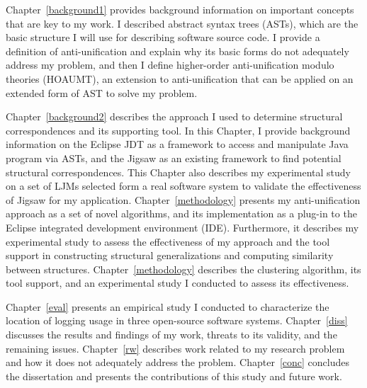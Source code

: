 Chapter~\ref{background1} provides background information on important concepts that are key to my work. I described abstract syntax trees (ASTs), which are the basic structure I will use for describing software source code. I provide a definition of anti-unification and explain why its basic forms do not adequately address my problem, and then I define higher-order anti-unification modulo theories (HOAUMT), an extension to anti-unification that can be applied on an extended form of AST to solve my problem. 

Chapter~\ref{background2} describes the approach I used to determine structural correspondences and its supporting tool. In this Chapter, I provide background information on the Eclipse JDT as a framework to access and manipulate Java program via ASTs, and the Jigsaw as an existing framework to find potential structural correspondences. This Chapter also describes my experimental study on a set of LJMs selected form a real software system to validate the effectiveness of Jigsaw for my application. Chapter~\ref{methodology} presents my anti-unification approach as a set of novel algorithms, and its implementation as a plug-in to the Eclipse integrated development environment (IDE). Furthermore, it describes my experimental study to assess the effectiveness of my approach and the tool support in constructing structural generalizations and computing similarity between structures.
Chapter~\ref{methodology} describes the clustering algorithm, its tool support, and an experimental study I conducted to assess its effectiveness.

 
Chapter~\ref{eval} presents an empirical study I conducted to characterize the location of logging usage in three open-source software systems. Chapter~\ref{diss} discusses the results and findings of my work, threats to its validity, and the remaining issues. Chapter~\ref{rw} describes work related to my research problem and how it does not adequately address the problem. Chapter~\ref{conc} concludes the dissertation and presents the contributions of this study and future work. %




